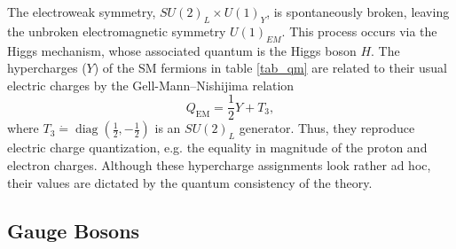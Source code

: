 The electroweak symmetry, $S U(2)_{L} \times U(1)_{Y}$, is spontaneously broken, leaving the  unbroken electromagnetic symmetry $U(1)_{EM}$. This process occurs via the Higgs mechanism, whose associated quantum is the Higgs boson $H$. The hypercharges ($Y$) of the SM fermions in table \ref{tab_qm} are related to their usual electric charges by the Gell-Mann–Nishijima relation~\parencite{10.1143/PTP.10.581} 
\begin{equation}
	Q_{\mathrm{EM}}=\frac12Y+T_{3}, \label{eq:Gell-Mann-Nishijima}
\end{equation}
where $T_{3}\dot=\operatorname{diag}\left(\frac{1}{2},-\frac{1}{2}\right)$ is an $S U(2)_{L}$ generator.  Thus, they reproduce electric charge quantization, e.g. the equality in magnitude of the proton and electron charges. Although these hypercharge assignments look rather ad hoc, their values are dictated by the quantum consistency of the theory.

\subsection{Gauge Bosons}

